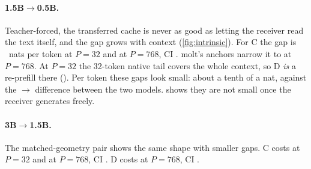 \paragraph{1.5B$\to$0.5B.}
Teacher-forced, the transferred cache is never as good as letting the receiver read the text itself, and the gap grows with context (\cref{fig:intrinsic}).
For C the gap is ~nats per token at $P=32$ and  at $P=768$, CI .
molt's anchors narrow it to  at $P=768$.
At $P=32$ the 32-token native tail covers the whole context, so D \emph{is} a re-prefill there ().
Per token these gaps look small: about a tenth of a nat, against the $\to$ difference between the two models.
 shows they are not small once the receiver generates freely.

\paragraph{3B$\to$1.5B.}
The matched-geometry pair shows the same shape with smaller gaps.
C costs  at $P=32$ and  at $P=768$, CI .
D costs  at $P=768$, CI .

